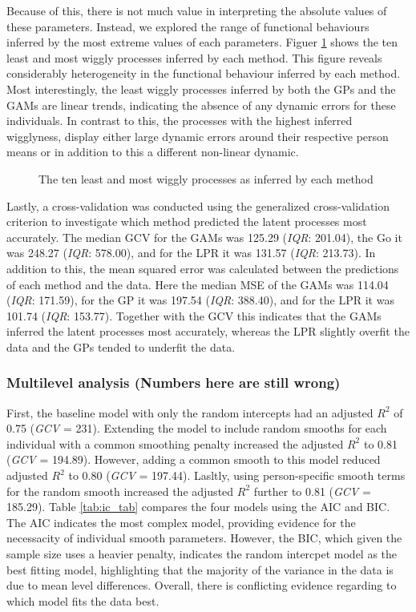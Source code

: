 \documentclass[man, floatsintext]{apa7}
\begin{document}
Because of this, there is not much value in interpreting the absolute values
of these parameters. Instead, we explored the range of functional behaviours
inferred by the most extreme values of each parameters. Figuer
\ref{fig:dem_smooth} shows
the ten least and most wiggly processes inferred by each method. This figure
reveals considerably heterogeneity in the functional behaviour inferred by
each method. Most interestingly, the least wiggly processes inferred by both
the GPs and the GAMs are linear trends, indicating the absence of any
dynamic errors for these individuals. In contrast to this, the processes
with the highest inferred wigglyness, display either large dynamic errors
around their respective person means or in addition to this a different
non-linear dynamic.

\begin{figure}[!ht]
  \caption{The ten least and most wiggly processes as inferred by each method}
  \label{fig:dem_smooth}
\end{figure}

Lastly, a cross-validation was conducted using the generalized cross-validation
criterion to investigate which method predicted the latent processes most
accurately. The median GCV for the GAMs was 125.29 (\textit{IQR}: 201.04),
the Go it was 248.27 (\textit{IQR}: 578.00), and for the LPR it was
131.57 (\textit{IQR}: 213.73). In addition to this, the mean squared error
was calculated between the predictions of each method and the data.
Here the median MSE of the GAMs was 114.04 (\textit{IQR}: 171.59),
for the GP it was 197.54 (\textit{IQR}: 388.40), and for the LPR it was
101.74 (\textit{IQR}: 153.77). Together with the GCV this indicates that
the GAMs inferred the latent processes most accurately, whereas the LPR
slightly overfit the data and the GPs tended to underfit the data.

\subsubsection{Multilevel analysis (Numbers here are still wrong)}

First, the baseline model with only the random intercepts had an
adjusted $R^2$ of 0.75 (\textit{GCV} = 231). Extending the model to include
random smooths for each individual with a common smoothing penalty increased
the adjusted $R^2$ to 0.81 (\textit{GCV} = 194.89). However, adding a common
smooth to this model reduced adjusted $R^2$ to 0.80 (\textit{GCV} = 197.44).
Lasltly, using person-specific smooth terms for the random smooth increased
the adjusted $R^2$ further to 0.81 (\textit{GCV} = 185.29). Table
\ref{tab:ic_tab} compares the four models using the AIC and BIC. The AIC
indicates the most complex model, providing
evidence for the necessacity of individual smooth parameters. However,
the BIC, which given the sample size uses a heavier penalty, indicates
the random intercpet model as the best fitting model, highlighting that
the majority of the variance in the data is due to mean level
differences. Overall, there is conflicting evidence regarding to which model
fits the data best.
\end{document}
